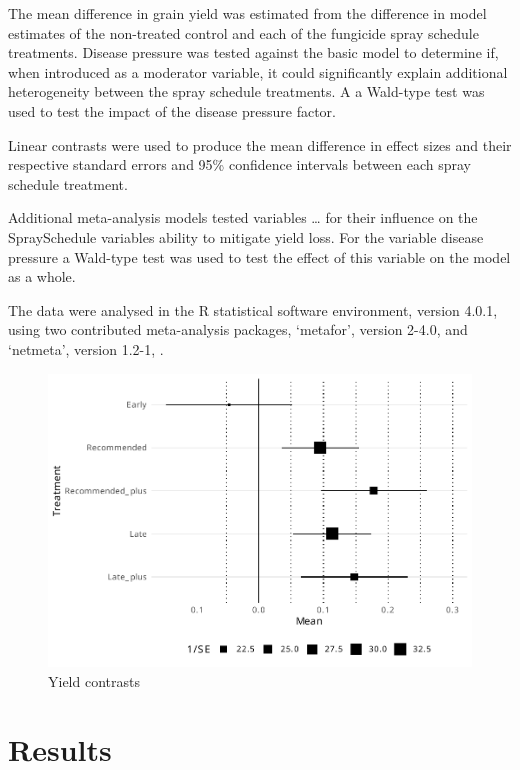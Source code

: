 \documentclass[agronomy,article,submit,moreauthors,pdftex]{mdpi}
\begin{document}
The mean difference in grain yield was estimated from the difference in model estimates of the non-treated control and each of the fungicide spray schedule treatments.
Disease pressure was tested against the basic model to determine if, when introduced as a moderator variable, it could significantly explain additional heterogeneity between the spray schedule treatments.
A a Wald-type test was used to test the impact of the disease pressure factor.

Linear contrasts were used to produce the mean difference in effect sizes and their respective standard errors and 95\% confidence intervals between each spray schedule treatment.

Additional meta-analysis models tested variables \ldots{} for their influence on the SpraySchedule variables ability to mitigate yield loss.
For the variable disease pressure a Wald-type test was used to test the effect of this variable on the model as a whole.

The data were analysed in the R statistical software environment, version 4.0.1, \citep{RCoreTeam2020} using two contributed meta-analysis packages, `metafor', version 2-4.0, \citep{Viechtbauer2010} and `netmeta', version 1.2-1, \citep{Rucker2020}.

\begin{figure}
\centering
\includegraphics{paper_files/figure-latex/Figure1-1.pdf}
\caption{\label{fig:Figure1}Yield contrasts}
\end{figure}

\hypertarget{results}{%
\section{Results}\label{results}}
\end{document}
